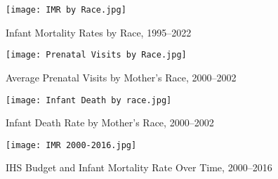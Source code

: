\documentclass[12pt]{article}
\begin{document}
\begin{figure}[!ht]
\centering
\caption{Infant Mortality Rates by Race, 1995--2022}
\label{fig:infant-mortality}
\texttt{[image: IMR by Race.jpg]}
\end{figure}

\begin{figure}[!ht]
\centering
\caption{Average Prenatal Visits by Mother's Race, 2000--2002}
\label{fig:prenatal-visits}
\texttt{[image: Prenatal Visits by Race.jpg]}
\end{figure}

\begin{figure}[!ht]
\centering
\caption{Infant Death Rate by Mother's Race, 2000--2002}
\label{fig:infant-death-rate}
\texttt{[image: Infant Death by race.jpg]}
\end{figure}

\begin{figure}[!ht]
\centering
\caption{IHS Budget and Infant Mortality Rate Over Time, 2000--2016}
\label{fig:ihs-budget-mortality}
\texttt{[image: IMR 2000-2016.jpg]}
\end{figure}
\end{document}
